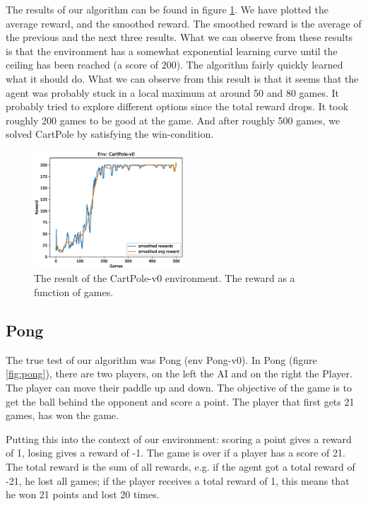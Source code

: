 \documentclass{article}
\begin{document}
The results of our algorithm can be found in figure \ref{fig:cartpole_results}. We have plotted the average reward, and the smoothed reward. The smoothed reward is the average of the previous and the next three results. What we can observe from these results is that the environment has a somewhat exponential learning curve until the ceiling has been reached (a score of 200). The algorithm fairly quickly learned what it should do. What we can observe from this result is that it seems that the agent was probably stuck in a local maximum at around 50 and 80 games. It probably tried to explore different options since the total reward drops. It took roughly 200 games to be good at the game. And after roughly 500 games, we solved CartPole by satisfying the win-condition.

\begin{figure}[H]
\centering
\includegraphics[width=0.5\textwidth]{images/cartpole_results.eps}
\caption{The result of the CartPole-v0 environment. The reward as a function of games.}
\label{fig:cartpole_results}
\end{figure}

\subsection{Pong}
The true test of our algorithm was Pong (env Pong-v0). In Pong (figure \ref{fig:pong}), there are two players, on the left the AI and on the right the Player. The player can move their paddle up and down. The objective of the game is to get the ball behind the opponent and score a point. The player that first gets 21 games, has won the game.

Putting this into the context of our environment: scoring a point gives a reward of 1, losing gives a reward of -1. The game is over if a player has a score of 21. The total reward is the sum of all rewards, e.g. if the agent got a total reward of -21, he lost all games; if the player receives a total reward of 1, this means that he won 21 points and lost 20 times.
\end{document}
